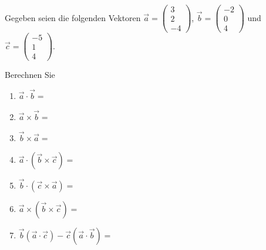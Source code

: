 \begin{ExerciseBlock}
Gegeben seien die folgenden Vektoren 
$\vec{a}=\left(\begin{array}{c} 3 \\ 2 \\ -4 \end{array}\right)$, 
$\vec{b}=\left(\begin{array}{c} -2 \\ 0 \\ 4\end{array}\right)$ und
${\vec{c}}=\left(\begin{array}{c} -5 \\ 1 \\ 4 \end{array}\right)$. \par

Berechnen Sie
\begin{enumerate}[label=\alph*)]
	\item $\vec{a} \cdot \vec{b} = $
	\item $\vec{a} \times \vec{b} = $
	\item $\vec{b} \times \vec{a} = $
	\item $\vec{a} \cdot \left( \vec{b} \times \vec{c} \right) =$
	\item $\vec{b} \cdot \left( \vec{c} \times \vec{a} \right) =$
	\item $\vec{a} \times \left( \vec{b} \times \vec{c} \right) =$
	\item $\vec{b} \left( \vec{a} \cdot \vec{c} \right) - \vec{c} \left( \vec{a} \cdot \vec{b} \right) = $
\end{enumerate} 

\end{ExerciseBlock}
